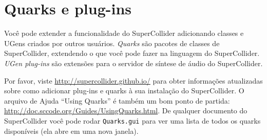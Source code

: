 \section{Quarks e plug-ins}

Você pode extender a funcionalidade do SuperCollider adicionando classes e UGens criados por outros usuários. \emph{Quarks} são pacotes de classes de SuperCollider, extendendo o que você pode fazer na linguagem do SuperCollider. \emph{UGen plug-ins} são extensões para o servidor de síntese de áudio do SuperCollider.

Por favor, viste \url{http://supercollider.github.io/} para obter informações atualizadas sobre como adicionar plug-ins e quarks à sua instalação do SuperCollider. O arquivo de Ajuda “Using Quarks” é também um bom ponto de partida: \url{http://doc.sccode.org/Guides/UsingQuarks.html}. De qualquer documento do SuperCollider você pode rodar \texttt{Quarks.gui} para ver uma lista de todos os quarks disponíveis (ela abre em uma nova janela).
